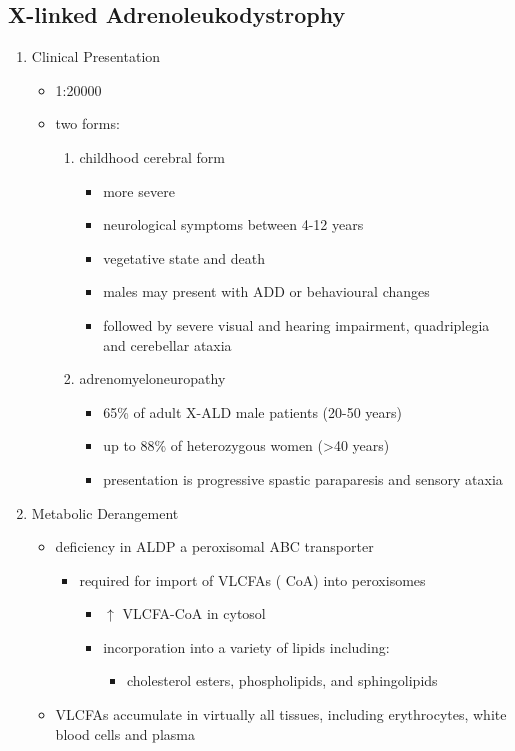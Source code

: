 \documentclass{scrartcl}
\begin{document}
\subsection{X-linked Adrenoleukodystrophy}
\label{sec:org634caa5}
\begin{enumerate}
\item Clinical Presentation
\label{sec:org8180be1}
\begin{itemize}
\item 1:20000
\item two forms:
\begin{enumerate}
\item childhood cerebral form
\begin{itemize}
\item more severe
\item neurological symptoms between 4-12 years
\item vegetative state and death
\item males may present with ADD or behavioural changes
\item followed by severe visual and hearing impairment, quadriplegia and
cerebellar ataxia
\end{itemize}
\item adrenomyeloneuropathy
\begin{itemize}
\item 65\% of adult X-ALD male patients (20-50 years)
\item up to 88\% of heterozygous women (\textgreater{}40 years)
\item presentation is progressive spastic paraparesis and sensory ataxia
\end{itemize}
\end{enumerate}
\end{itemize}

\item Metabolic Derangement
\label{sec:org2a4374d}
\begin{itemize}
\item deficiency in ALDP a peroxisomal ABC transporter
\begin{itemize}
\item required for import of VLCFAs (\textpm{} CoA) into peroxisomes
\begin{itemize}
\item \(\uparrow\) VLCFA-CoA in cytosol
\item incorporation into a variety of lipids including:
\begin{itemize}
\item cholesterol esters, phospholipids, and sphingolipids
\end{itemize}
\end{itemize}
\end{itemize}
\item VLCFAs accumulate in virtually all tissues, including erythrocytes,
white blood cells and plasma
\end{itemize}


\end{enumerate}
\end{document}
